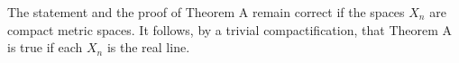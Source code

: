 The statement and the proof of Theorem A remain correct if the spaces $X_n$ are compact metric spaces. It follows, by a trivial compactification, that Theorem A is true if each $X_n$ is the real line.
